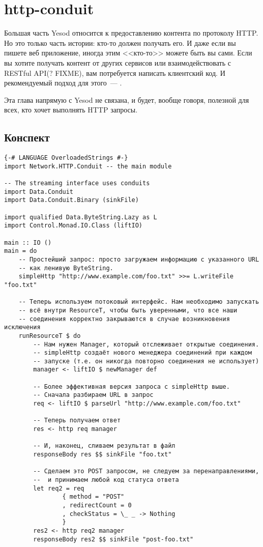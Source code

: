 \chapter{http-conduit}
Большая часть Yesod относится к предоставлению контента по протоколу
HTTP. Но это только часть истории: кто-то должен получать его. И даже
если вы пишете веб приложение, иногда этим <<кто-то>> можете быть вы
сами. Если вы хотите получать контент от других сервисов или
взаимодействовать с RESTful API(? FIXME), вам потребуется написать
клиентский код. И рекомендуемый подход для этого~---
.

Эта глава напрямую с Yesod не связана, и будет, вообще говоря, полезной для
всех, кто хочет выполнять HTTP запросы.

\section{Конспект}
\begin{lstlisting}
{-# LANGUAGE OverloadedStrings #-}
import Network.HTTP.Conduit -- the main module

-- The streaming interface uses conduits
import Data.Conduit
import Data.Conduit.Binary (sinkFile)

import qualified Data.ByteString.Lazy as L
import Control.Monad.IO.Class (liftIO)

main :: IO ()
main = do
    -- Простейший запрос: просто загружаем информацию с указанного URL
    -- как ленивую ByteString.
    simpleHttp "http://www.example.com/foo.txt" >>= L.writeFile "foo.txt"

    -- Теперь используем потоковый интерфейс. Нам необходимо запускать
    -- всё внутри ResourceT, чтобы быть уверенными, что все наши
    -- соединения корректно закрываются в случае возникновения исключения
    runResourceT $ do
        -- Нам нужен Manager, который отслеживает открытые соединения.
        -- simpleHttp создаёт нового менеджера соединений при каждом
        -- запуске (т.е. он никогда повторно соединения не использует)
        manager <- liftIO $ newManager def

        -- Более эффективная версия запроса с simpleHttp выше.
        -- Сначала разбираем URL в запрос
        req <- liftIO $ parseUrl "http://www.example.com/foo.txt"

        -- Теперь получаем ответ
        res <- http req manager

        -- И, наконец, сливаем результат в файл
        responseBody res $$ sinkFile "foo.txt"

        -- Сделаем это POST запросом, не следуем за перенаправлениями,
        --  и принимаем любой код статуса ответа
        let req2 = req
                { method = "POST"
                , redirectCount = 0
                , checkStatus = \_ _ -> Nothing
                }
        res2 <- http req2 manager
        responseBody res2 $$ sinkFile "post-foo.txt"
\end{lstlisting} %

